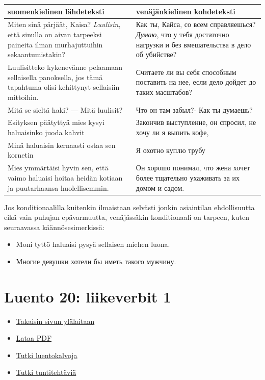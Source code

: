 \documentclass[]{scrartcl}
\providecommand{\tightlist}{%
  \setlength{\itemsep}{0pt}\setlength{\parskip}{0pt}}
\begin{document}
\begin{longtable}[c]{@{}ll@{}}
\toprule
suomenkielinen lähdeteksti & venäjänkielinen kohdeteksti\tabularnewline
\midrule
\endhead
Miten sinä pärjäät, Kaisa? \emph{Luulisin}, että sinulla on aivan
tarpeeksi paineita ilman murhajuttuihin sekaantumistakin? & Как ты,
Кайса, со всем справляешься? \emph{Думаю}, что у тебя достаточно
нагрузки и без вмешательства в дело об убийстве?\tabularnewline
Luulisitteko kykenevänne pelaamaan sellaisella panoksella, jos tämä
tapahtuma olisi kehittynyt sellaisiin mittoihin. & Считаете ли вы себя
способным поставить на нее, если дело дойдет до таких
масштабов?\tabularnewline
Mitä se sieltä haki? --- Mitä luulisit? & Что он там забыл?- Как ты
думаешь?\tabularnewline
Esityksen päätyttyä mies kysyi haluaisinko juoda kahvit & Закончив
выступление, он спросил, не хочу ли я выпить кофе,\tabularnewline
Minä haluaisin kernaasti ostaa sen kornetin & Я охотно куплю
трубу\tabularnewline
Mies ymmärtäisi hyvin sen, että vaimo haluaisi hoitaa heidän kotiaan ja
puutarhaansa huolellisemmin. & Он хорошо понимал, что жена хочет более
тщательно ухаживать за их домом и садом.\tabularnewline
\bottomrule
\end{longtable}

Jos konditionaalilla kuitenkin ilmaistaan selvästi jonkin asiaintilan
ehdollisuutta eikä vain puhujan epävarmuutta, venäjässäkin konditionaali
on tarpeen, kuten seuraavassa käännösesimerkissä:

\begin{itemize}
\tightlist
\item
  Moni tyttö haluaisi pysyä sellaisen miehen luona.\\
\item
  Многие девушки хотели бы иметь такого мужчину.
\end{itemize}

\section{Luento 20: liikeverbit 1}\label{luento-20-liikeverbit-1}

\begin{itemize}
\tightlist
\item
  \href{https://mustikka.uta.fi/~juho_harme/morfologia/\#tästä-kurssista}{Takaisin
  sivun ylälaitaan}
\item
  \href{http://mustikka.uta.fi/~juho_harme/morfologia/materiaalit/luento20.pdf}{Lataa
  PDF}
\item
  \href{http://mustikka.uta.fi/~juho_harme/morfologia/presentations/luento20.html}{Tutki
  luentokalvoja}
\item
  \href{http://mustikka.uta.fi/~juho_harme/morfologia/tehtavat/luento20.pdf}{Tutki
  tuntitehtäviä}
\end{itemize}
\end{document}

